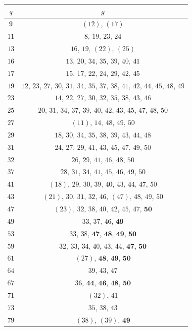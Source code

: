 \documentclass{amsart}
\begin{document}
\begin{center}
\begin{table}[!h]
\begin{tabular}{ c    c   }
$q$  &  $g$  \\ \hline 
\rule{0pt}{4mm}%
$9$ & $(12)$,  $(17)$\\
$11$ & $8$,  $19$, $23$, $24$\\
$13$ & $16$,  $19$, $(22)$, $(25)$\\
$16$ & $13$,  $20$, $34$, $35$, $39$, $40$, $41$\\
$17$ & $15$,  $17$, $22$, $24$, $29$, $42$, $45$\\
$19$ & $12$,  $23$, $27$, $30$, $31$, $34$, $35$, $37$, $38$, $41$, $42$, $44$, $45$, $48$, $49$\\
$23$ & $14$,  $22$, $27$, $30$, $32$, $35$, $38$, $43$, $46$\\
$25$ & $20$,  $31$, $34$, $37$, $39$, $40$, $42$, $43$, $45$, $47$, $48$, $50$\\
$27$ & $(11)$,  $14$, $48$, $49$, $50$\\
$29$ & $18$,  $30$, $34$, $35$, $38$, $39$, $43$, $44$, $48$\\
$31$ & $24$,  $27$, $29$, $41$, $43$, $45$, $47$, $49$, $50$\\
$32$ & $26$,  $29$, $41$, $46$, $48$, $50$\\
$37$ & $28$,  $31$, $34$, $41$, $45$, $46$, $49$, $50$\\
$41$ & $(18)$,  $29$, $30$, $39$, $40$, $43$, $44$, $47$, $50$\\
$43$ & $(21)$,  $30$, $31$, $32$, $46$, $(47)$, $48$, $49$, $50$\\
$47$ & $(23)$,  $32$, $38$, $40$, $42$, $45$, $47$, $\textbf{50}$\\
$49$ & $33$,  $37$, $46$, $\textbf{49}$\\
$53$ & $33$,  $38$, $\textbf{47}$, $\textbf{48}$, $\textbf{49}$, $\textbf{50}$\\
$59$ & $32$,  $33$, $34$,  $40$,  $43$, $44$, $\textbf{47}$, $\textbf{50}$\\
$61$ & $(27)$,  $\textbf{48}$, $\textbf{49}$, $\textbf{50}$\\
$64$ & $39$,  $43$, $47$\\
$67$ & $36$,  $\textbf{44}$, $\textbf{46}$, $\textbf{48}$, $\textbf{50}$\\
$71$ & $(32)$,  $41$\\
$73$ & $35$,  $38$, $43$\\
$79$ & $(38)$,  $(39)$, $\textbf{49}$\\

\end{tabular}
\end{table}
\end{center}
\end{document}

